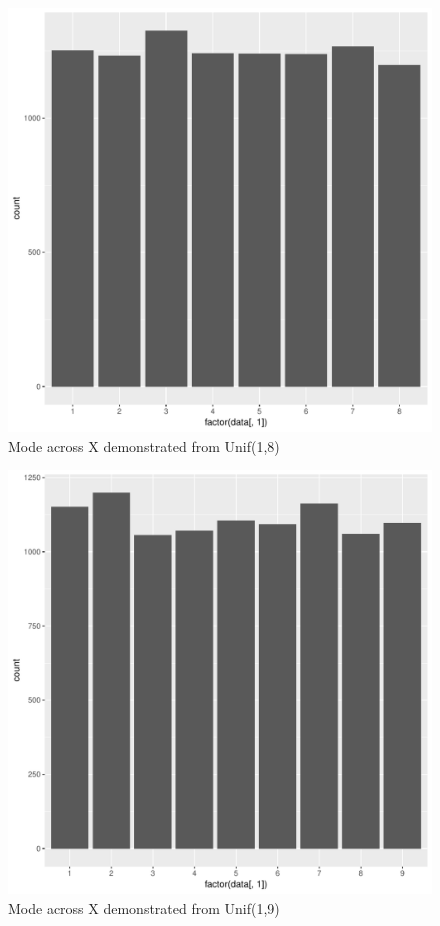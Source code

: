 \documentclass[11pt]{article}
\begin{document}
\begin{enumerate}
\begin{enumerate}
\begin{figure}[H]
	\end{figure}
	\begin{figure}[H]
		\centering
		\caption{Mode across X demonstrated from Unif(1,8)}
		\includegraphics[scale=.4]{8graph.pdf}
	\end{figure}
	\begin{figure}[H]
		\centering
		\caption{Mode across X demonstrated from Unif(1,9)}
		\includegraphics[scale=.4]{9graph.pdf}

\end{figure}
\end{enumerate}
\end{enumerate}
\end{document}
